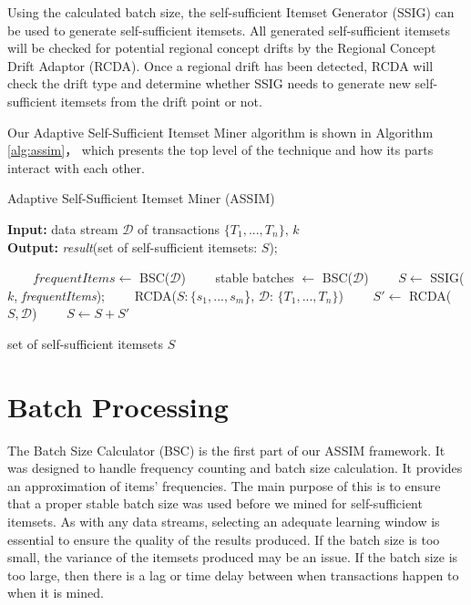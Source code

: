 Using the calculated batch size, the self-sufficient Itemset Generator (SSIG) can be used to generate self-sufficient itemsets. All generated self-sufficient itemsets will be checked for potential regional concept drifts by the Regional Concept Drift Adaptor (RCDA). Once a regional drift has been detected, RCDA will check the drift type and determine whether SSIG needs to generate new self-sufficient itemsets from the drift point or not.

Our Adaptive Self-Sufficient Itemset Miner algorithm is shown in Algorithm \ref{alg:assim}， which presents the top level of the technique and how its parts interact with each other.

\begin{algorithm}[h!]
\caption{Adaptive Self-Sufficient Itemset Miner (ASSIM)} 
\label{alg:assim}
\hspace*{0.02in} {\bf Input:} 
data stream $\mathcal{D}$ of transactions $\{T_1, ..., T_n\}$, $k$\\
\hspace*{0.02in} {\bf Output:} 
\textit{result}(set of self-sufficient itemsets: $S$);
\begin{algorithmic}[1]

　　\State $frequentItems\leftarrow$ BSC($\mathcal{D}$)
　　\State stable batches $\leftarrow$ BSC($\mathcal{D}$)
　　\State $S\leftarrow$ SSIG($k$, \textit{frequentItems});
　　\State RCDA($S:\{s_1, ..., s_m$\}, $\mathcal{D}$: $\{T_1, ..., T_n\}$)
　　\State $S'\leftarrow$ RCDA($S, \mathcal{D}$)
　　\State $S \leftarrow S + S'$
\EndWhile

\State \Return set of self-sufficient itemsets $S$
\end{algorithmic}
\end{algorithm}

\section{Batch Processing}


The Batch Size Calculator (BSC) is the first part of our ASSIM framework. It was designed to handle frequency counting and batch size calculation. It provides an approximation of items’ frequencies. The main purpose of this is to ensure that a proper stable batch size was used before we mined for self-sufficient itemsets. As with any data streams, selecting an adequate learning window is essential to ensure the quality of the results produced. If the batch size is too small, the variance of the itemsets produced may be an issue. If the batch size is too large, then there is a lag or time delay between when transactions happen to when it is mined.  

